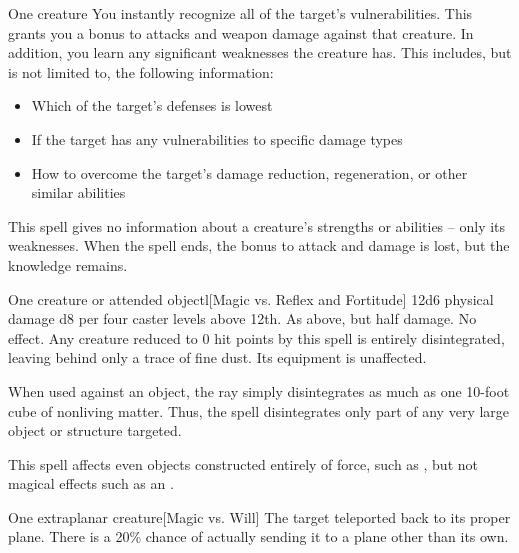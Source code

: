 \spellrng{\rngmed}
\spelldur{\durshort}
\begin{spelltarget}{One creature}
    \spelleffect You instantly recognize all of the target's vulnerabilities. This grants you a  bonus to attacks and weapon damage against that creature. In addition, you learn any significant weaknesses the creature has. This includes, but is not limited to, the following information:
    \begin{itemize}
        \item Which of the target's defenses is lowest
        \item If the target has any vulnerabilities to specific damage types
        \item How to overcome the target's damage reduction, regeneration, or other similar abilities
    \end{itemize}
\end{spelltarget}
\spellnotes This spell gives no information about a creature's strengths or abilities -- only its weaknesses. When the spell ends, the bonus to attack and damage is lost, but the knowledge remains.

\spellrng{\rngclose}
\begin{spelltarget}{One creature or attended object}l[Magic vs. Reflex and Fortitude]
    \spellsuccess 12d6 physical damage \add d8 per four caster levels above 12th.
    \spellfailure[Fortitude] As above, but half damage.
    \spellfailure[Reflex] No effect.
    \spelleffect Any creature reduced to 0 hit points by this spell is entirely disintegrated, leaving behind only a trace of fine dust. Its equipment is unaffected.
    \par When used against an object, the ray simply disintegrates as much as one 10-foot cube of nonliving matter. Thus, the spell disintegrates only part of any very large object or structure targeted.
\end{spelltarget}
\spellnotes This spell affects even objects constructed entirely of force, such as , but not magical effects such as an .

\spellrng{\rngclose}
\begin{spelltarget}{One extraplanar creature}[Magic vs. Will]
    \spellsuccess The target teleported back to its proper plane. There is a 20\% chance of actually sending it to a plane other than its own.
\end{spelltarget}

